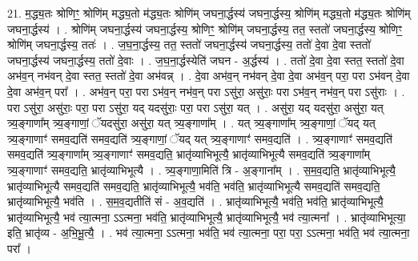 \documentclass[17pt]{extarticle}
\begin{document}
21. म॒द्ध्य॒तः श्रोणिꣳ॒॒ श्रोणि॑म् मद्ध्य॒तो म॑द्ध्य॒तः श्रोणि॑म् जघना॒र्द्धस्य॑ जघना॒र्द्धस्य॒ श्रोणि॑म् मद्ध्य॒तो म॑द्ध्य॒तः श्रोणि॑म् जघना॒र्द्धस्य॑ । . श्रोणि॑म् जघना॒र्द्धस्य॑ जघना॒र्द्धस्य॒ श्रोणिꣳ॒॒ श्रोणि॑म् जघना॒र्द्धस्य॒ तत॒ स्ततो॑ जघना॒र्द्धस्य॒ श्रोणिꣳ॒॒ श्रोणि॑म् जघना॒र्द्धस्य॒ ततः॑ । . ज॒घ॒ना॒र्द्धस्य॒ तत॒ स्ततो॑ जघना॒र्द्धस्य॑ जघना॒र्द्धस्य॒ ततो॑ दे॒वा दे॒वा स्ततो॑ जघना॒र्द्धस्य॑ जघना॒र्द्धस्य॒ ततो॑ दे॒वाः । . ज॒घ॒ना॒र्द्धस्येति॑ जघन - अ॒र्द्धस्य॑ । . ततो॑ दे॒वा दे॒वा स्तत॒ स्ततो॑ दे॒वा अभ॑व॒न् नभ॑वन् दे॒वा स्तत॒ स्ततो॑ दे॒वा अभ॑वन्न् । . दे॒वा अभ॑व॒न् नभ॑वन् दे॒वा दे॒वा अभ॑व॒न् परा॒ परा ऽभ॑वन् दे॒वा दे॒वा अभ॑व॒न् परा᳚ । . अभ॑व॒न् परा॒ परा ऽभ॑व॒न् नभ॑व॒न् परा ऽसु॑रा॒ असु॑राः॒ परा ऽभ॑व॒न् नभ॑व॒न् परा ऽसु॑राः । . परा ऽसु॑रा॒ असु॑राः॒ परा॒ परा ऽसु॑रा॒ यद् यदसु॑राः॒ परा॒ परा ऽसु॑रा॒ यत् । . असु॑रा॒ यद् यदसु॑रा॒ असु॑रा॒ यत् त्र्य॒ङ्गाणा᳚म् त्र्य॒ङ्गाणां॒ ॅयदसु॑रा॒ असु॑रा॒ यत् त्र्य॒ङ्गाणा᳚म् । . यत् त्र्य॒ङ्गाणा᳚म् त्र्य॒ङ्गाणां॒ ॅयद् यत् त्र्य॒ङ्गाणाꣳ॑ समव॒द्यति॑ समव॒द्यति॑ त्र्य॒ङ्गाणां॒ ॅयद् यत् त्र्य॒ङ्गाणाꣳ॑ समव॒द्यति॑ । . त्र्य॒ङ्गाणाꣳ॑ समव॒द्यति॑ समव॒द्यति॑ त्र्य॒ङ्गाणा᳚म् त्र्य॒ङ्गाणाꣳ॑ समव॒द्यति॒ भ्रातृ॑व्याभिभूत्यै॒ भ्रातृ॑व्याभिभूत्यै समव॒द्यति॑ त्र्य॒ङ्गाणा᳚म् त्र्य॒ङ्गाणाꣳ॑ समव॒द्यति॒ भ्रातृ॑व्याभिभूत्यै । . त्र्य॒ङ्गाणा॒मिति॑ त्रि - अ॒ङ्गाना᳚म् । . स॒म॒व॒द्यति॒ भ्रातृ॑व्याभिभूत्यै॒ भ्रातृ॑व्याभिभूत्यै समव॒द्यति॑ समव॒द्यति॒ भ्रातृ॑व्याभिभूत्यै॒ भव॑ति॒ भव॑ति॒ भ्रातृ॑व्याभिभूत्यै समव॒द्यति॑ समव॒द्यति॒ भ्रातृ॑व्याभिभूत्यै॒ भव॑ति । . स॒म॒व॒द्यतीति॑ सं - अ॒व॒द्यति॑ । . भ्रातृ॑व्याभिभूत्यै॒ भव॑ति॒ भव॑ति॒ भ्रातृ॑व्याभिभूत्यै॒ भ्रातृ॑व्याभिभूत्यै॒ भव॑ त्या॒त्मना॒ ऽऽत्मना॒ भव॑ति॒ भ्रातृ॑व्याभिभूत्यै॒ भ्रातृ॑व्याभिभूत्यै॒ भव॑ त्या॒त्मना᳚ । . भ्रातृ॑व्याभिभूत्या॒ इति॒ भ्रातृ॑व्य - अ॒भि॒भू॒त्यै॒ । . भव॑ त्या॒त्मना॒ ऽऽत्मना॒ भव॑ति॒ भव॑ त्या॒त्मना॒ परा॒ परा॒ ऽऽत्मना॒ भव॑ति॒ भव॑ त्या॒त्मना॒ परा᳚ । \newline
\end{document}
